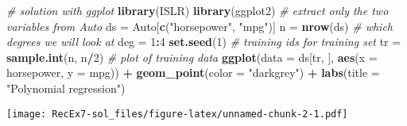 \documentclass[]{article}
\newenvironment{Shaded}{\begin{snugshade}}{\end{snugshade}}
\newcommand{\KeywordTok}[1]{\textcolor[rgb]{0.13,0.29,0.53}{\textbf{#1}}}
\newcommand{\DataTypeTok}[1]{\textcolor[rgb]{0.13,0.29,0.53}{#1}}
\newcommand{\DecValTok}[1]{\textcolor[rgb]{0.00,0.00,0.81}{#1}}
\newcommand{\StringTok}[1]{\textcolor[rgb]{0.31,0.60,0.02}{#1}}
\newcommand{\CommentTok}[1]{\textcolor[rgb]{0.56,0.35,0.01}{\textit{#1}}}
\newcommand{\OperatorTok}[1]{\textcolor[rgb]{0.81,0.36,0.00}{\textbf{#1}}}
\newcommand{\NormalTok}[1]{#1}
\begin{document}
\begin{Shaded}
\begin{Highlighting}[]
\CommentTok{# solution with ggplot}
\KeywordTok{library}\NormalTok{(ISLR)}
\KeywordTok{library}\NormalTok{(ggplot2)}
\CommentTok{# extract only the two variables from Auto}
\NormalTok{ds =}\StringTok{ }\NormalTok{Auto[}\KeywordTok{c}\NormalTok{(}\StringTok{"horsepower"}\NormalTok{, }\StringTok{"mpg"}\NormalTok{)]}
\NormalTok{n =}\StringTok{ }\KeywordTok{nrow}\NormalTok{(ds)}
\CommentTok{# which degrees we will look at}
\NormalTok{deg =}\StringTok{ }\DecValTok{1}\OperatorTok{:}\DecValTok{4}
\KeywordTok{set.seed}\NormalTok{(}\DecValTok{1}\NormalTok{)}
\CommentTok{# training ids for training set}
\NormalTok{tr =}\StringTok{ }\KeywordTok{sample.int}\NormalTok{(n, n}\OperatorTok{/}\DecValTok{2}\NormalTok{)}
\CommentTok{# plot of training data}
\KeywordTok{ggplot}\NormalTok{(}\DataTypeTok{data =}\NormalTok{ ds[tr, ], }\KeywordTok{aes}\NormalTok{(}\DataTypeTok{x =}\NormalTok{ horsepower, }\DataTypeTok{y =}\NormalTok{ mpg)) }\OperatorTok{+}\StringTok{ }\KeywordTok{geom_point}\NormalTok{(}\DataTypeTok{color =} \StringTok{"darkgrey"}\NormalTok{) }\OperatorTok{+}\StringTok{ }
\StringTok{    }\KeywordTok{labs}\NormalTok{(}\DataTypeTok{title =} \StringTok{"Polynomial regression"}\NormalTok{)}
\end{Highlighting}
\end{Shaded}

\texttt{[image: RecEx7-sol\_files/figure-latex/unnamed-chunk-2-1.pdf]}
\end{document}
